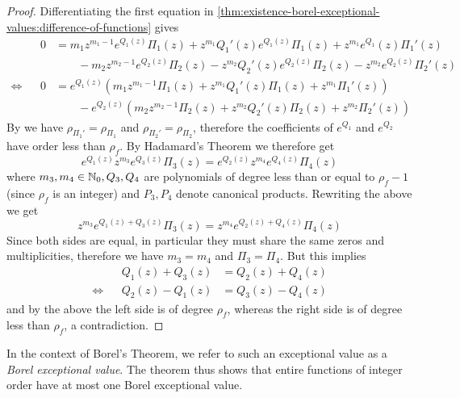 \begin{proof}
    Differentiating the first equation in \eqref{thm:existence-borel-exceptional-values:difference-of-functions} gives
    \begin{equation*}
    \begin{aligned}
        && 0 &= m_1 z^{m_1 - 1} e^{Q_1(z)} \Pi_1(z) + z^{m_1} Q_1'(z) e^{Q_1(z)} \Pi_1(z) + z^{m_1} e^{Q_1}(z) \Pi_1'(z) \\
        && &\quad\quad - m_2 z^{m_2 - 1} e^{Q_2(z)} \Pi_2(z) - z^{m_2} Q_2'(z) e^{Q_2(z)} \Pi_2(z) - z^{m_2} e^{Q_2(z)} \Pi_2'(z) \\
        \Leftrightarrow && 0 &= e^{Q_1(z)} (m_1 z^{m_1 - 1} \Pi_1(z) + z^{m_1} Q_1'(z) \Pi_1(z) + z^{m_1} \Pi_1'(z)) \\
        && &\quad\quad - e^{Q_2(z)} (m_2 z^{m_2 - 1} \Pi_2(z) + z^{m_2} Q_2'(z) \Pi_2(z) + z^{m_2} \Pi_2'(z))
    \end{aligned}
    \end{equation*}
    By  we have $\rho_{\Pi_1'} = \rho_{\Pi_1}$ and $\rho_{\Pi_2'} = \rho_{\Pi_2}$, therefore the coefficients of $e^{Q_1}$ and $e^{Q_2}$ have order less than $\rho_f$. By Hadamard's Theorem we therefore get
    \begin{equation*}
        e^{Q_1(z)} z^{m_3} e^{Q_3(z)} \Pi_3(z) = e^{Q_2(z)} z^{m_4} e^{Q_4(z)} \Pi_4(z)
    \end{equation*}
    where $m_3, m_4 \in \mathbb{N}_0, Q_3, Q_4$ are polynomials of degree less than or equal to $\rho_f - 1$ (since $\rho_f$ is an integer) and $P_3, P_4$ denote canonical products. Rewriting the above we get
    \begin{equation*}
        z^{m_3} e^{Q_1(z) + Q_3(z)} \Pi_3(z) = z^{m_4} e^{Q_2(z) + Q_4(z)} \Pi_4(z)
    \end{equation*}
    Since both sides are equal, in particular they must share the same zeros and multiplicities, therefore we have $m_3 = m_4$ and $\Pi_3 = \Pi_4$. But this implies
    \begin{equation*}
    \begin{aligned}
        && Q_1(z) + Q_3(z) &= Q_2(z) + Q_4(z) \\
        \Leftrightarrow && Q_2(z) - Q_1(z) &= Q_3(z) - Q_4(z)
    \end{aligned}
    \end{equation*}
    and by the above the left side is of degree $\rho_f$, whereas the right side is of degree less than $\rho_f$, a contradiction.
\end{proof}

In the context of Borel's Theorem, we refer to such an exceptional value as a \emph{Borel exceptional value}. The theorem thus shows that entire functions of integer order have at most one Borel exceptional value.

